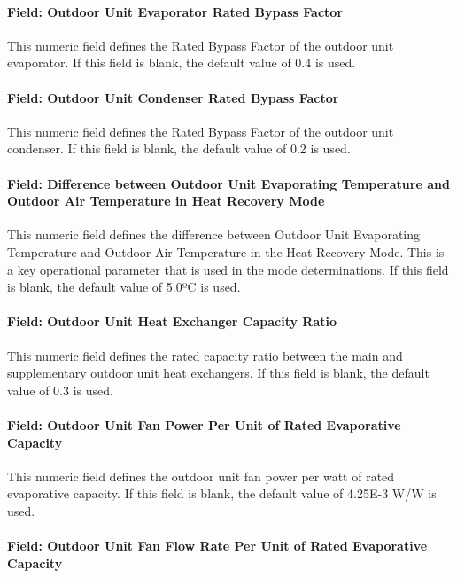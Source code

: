\paragraph{Field: Outdoor Unit Evaporator Rated Bypass Factor}

This numeric field defines the Rated Bypass Factor of the outdoor unit evaporator. If this field is blank, the default value of 0.4 is used.

\paragraph{Field: Outdoor Unit Condenser Rated Bypass Factor}

This numeric field defines the Rated Bypass Factor of the outdoor unit condenser. If this field is blank, the default value of 0.2 is used.

\paragraph{Field: Difference between Outdoor Unit Evaporating Temperature and Outdoor Air Temperature in Heat Recovery Mode}

This numeric field defines the difference between Outdoor Unit Evaporating Temperature and Outdoor Air Temperature in the Heat Recovery Mode. This is a key operational parameter that is used in the mode determinations. If this field is blank, the default value of 5.0ºC is used.

\paragraph{Field: Outdoor Unit Heat Exchanger Capacity Ratio}

This numeric field defines the rated capacity ratio between the main and supplementary outdoor unit heat exchangers. If this field is blank, the default value of 0.3 is used.

\paragraph{Field: Outdoor Unit Fan Power Per Unit of Rated Evaporative Capacity}

This numeric field defines the outdoor unit fan power per watt of rated evaporative capacity. If this field is blank, the default value of 4.25E-3 W/W is used.

\paragraph{Field: Outdoor Unit Fan Flow Rate Per Unit of Rated Evaporative Capacity}

